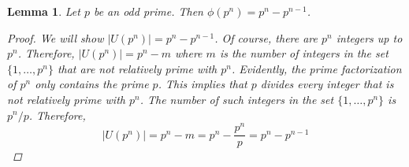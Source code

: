 \documentclass[12pt,reqno]{article}
\theoremstyle{plain}
\newtheorem{lemma}{Lemma}
\theoremstyle{definition}
\begin{document}
\bigskip

\begin{lemma}
    \label{lem:phi}
    Let \(p\) be an odd prime. Then \(\phi(p^n)=p^n-p^{n-1}\).
    \begin{proof}
        We will show \(|U(p^n)|=p^n-p^{n-1}\). Of course, there are \(p^n\) integers up to \(p^n\). Therefore,
        \(|U(p^n)|=p^n-m\) where \(m\) is the number of integers in the set \(\{1,\ldots,p^n\}\) 
        that are not relatively prime with \(p^n\). Evidently, the prime factorization of \(p^n\) only contains
        the prime \(p\). This implies that \(p\) divides every integer that is not relatively prime with \(p^n\).
        The number of such integers in the set \(\{1,\ldots,p^n\}\) is \(p^n/p\). Therefore,
        \[|U(p^n)|=p^n-m=p^n-\frac{p^n}{p}=p^n-p^{n-1}\]
    \end{proof}
\end{lemma}
\end{document}
